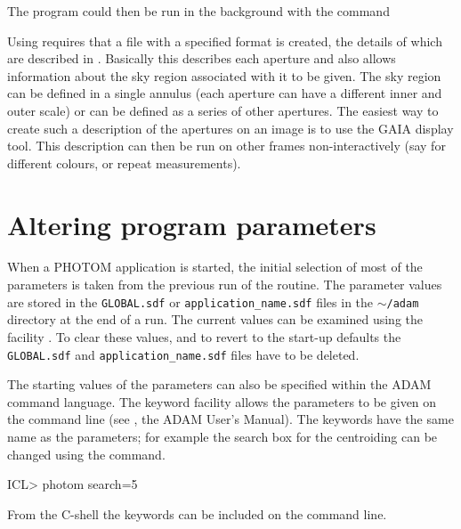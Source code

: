 \documentclass[twoside,11pt,nolof]{starlink}
\begin{document}
The program could then be run in the background with the command
\begin{terminalv}
\end{terminalv}

Using  requires that a file with a
specified format is created, the details of which are described in
.
Basically this
describes each aperture and also allows information about the sky
region associated with it to be given. The sky region can be defined
in a single annulus (each aperture can have a different inner and
outer scale) or can be defined as a series of other apertures. The
easiest way to create such a description of the apertures on an image
is to use the GAIA display tool. This description can then be run on
other frames non-interactively (say for different colours, or repeat
measurements).


\section{Altering program parameters}

When a PHOTOM application is started, the initial selection of most of
the parameters is taken from the previous run of the routine. The
parameter values are stored in the \texttt{GLOBAL.sdf} or
\texttt{application\_name.sdf} files in the \texttt{$\sim$/adam} directory at the
end of a run. The current values can be examined using the
 facility . To clear these
values, and to revert to the start-up defaults the \texttt{GLOBAL.sdf}
and \texttt{application\_name.sdf} files have to be deleted.

The starting values of the parameters can also be specified within the
ADAM command language. The keyword facility allows the parameters to
be given on the command line (see , the ADAM User's
Manual). The keywords have the same name as the parameters; for
example the search box for the centroiding can be changed using the
command.
\begin{terminalv}
ICL> photom search=5
\end{terminalv}

From the C-shell the keywords can be included on the command line.
\begin{terminalv}
\end{terminalv}
\end{document}
